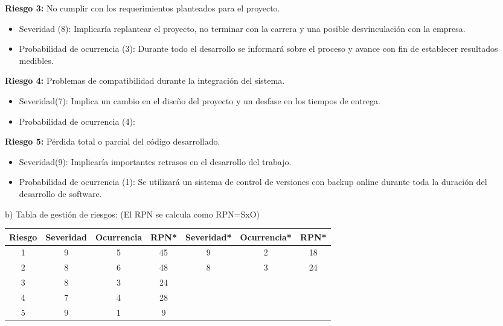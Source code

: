 \documentclass[11pt]{charter}
\begin{document}
\textbf{Riesgo 3:} No cumplir con los requerimientos planteados para el proyecto.
\begin{itemize}
\item Severidad (8): Implicaría replantear el proyecto, no terminar con la carrera y una posible desvinculación con la empresa. 
\item Probabilidad de ocurrencia (3): Durante todo el desarrollo se informará sobre el proceso y avance con fin de establecer resultados medibles.
\end{itemize}

\textbf{Riesgo 4:} Problemas de compatibilidad durante la integración del sistema.
\begin{itemize}
\item Severidad(7): Implica un cambio en el diseño del proyecto y un desfase en los tiempos de entrega.
\item Probabilidad de ocurrencia (4):
\end{itemize}

\textbf{Riesgo 5:} Pérdida total o parcial del código desarrollado.
\begin{itemize}
\item Severidad(9): Implicaría importantes retrasos en el desarrollo del trabajo.
\item Probabilidad de ocurrencia (1): Se utilizará un sistema de control de versiones con backup online durante toda la duración del desarrollo de software.
\end{itemize}

b) Tabla de gestión de riesgos:      (El RPN se calcula como RPN=SxO)

\begin{table}[htbp]
\begin{tabular}{|c|c|c|c|c|c|c|}
\hline
\rowcolor[HTML]{C0C0C0} 
Riesgo & Severidad & Ocurrencia & RPN*                       & Severidad* & Ocurrencia* & RPN*                     \\ \hline 
1      & 9         & 5          & \cellcolor[HTML]{FD6864}45 &     9      &     2       & \cellcolor[HTML]{34FF34}18\\ \hline
2      & 8         & 6          & \cellcolor[HTML]{FD6864}48 &     8      &     3       & \cellcolor[HTML]{34FF34}24\\ \hline
3      & 8         & 3          & \cellcolor[HTML]{34FF34}24 &            &             &                          \\ \hline
4      & 7         & 4          & \cellcolor[HTML]{34FF34}28 &            &             &                          \\ \hline
5      & 9         & 1          & \cellcolor[HTML]{34FF34}9  &            &             &                          \\ \hline
\end{tabular}
\end{table}
\end{document}
